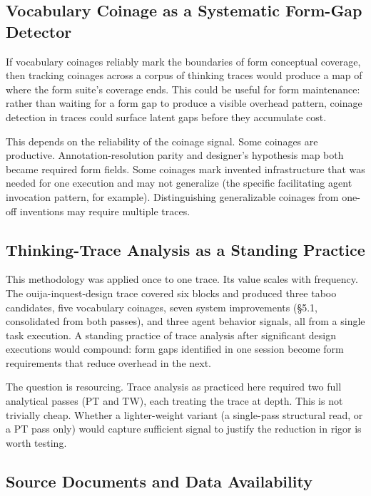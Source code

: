 \documentclass[11pt,a4paper]{article}
\begin{document}
\subsection{Vocabulary Coinage as a Systematic Form-Gap Detector}

If vocabulary coinages reliably mark the boundaries of form conceptual
coverage, then tracking coinages across a corpus of thinking traces would
produce a map of where the form suite's coverage ends. This could be useful
for form maintenance: rather than waiting for a form gap to produce a visible
overhead pattern, coinage detection in traces could surface latent gaps before
they accumulate cost.

This depends on the reliability of the coinage signal. Some coinages are
productive. Annotation-resolution parity and designer's hypothesis map both
became required form fields. Some coinages mark invented infrastructure that
was needed for one execution and may not generalize (the specific facilitating
agent invocation pattern, for example). Distinguishing generalizable coinages
from one-off inventions may require multiple traces.

\subsection{Thinking-Trace Analysis as a Standing Practice}

This methodology was applied once to one trace. Its value scales with
frequency. The ouija-inquest-design trace covered six blocks and produced three
taboo candidates, five vocabulary coinages, seven system improvements
(\S5.1, consolidated from both passes), and three agent behavior signals, all
from a single task execution. A standing practice of trace analysis after
significant design executions would compound: form gaps identified in one
session become form requirements that reduce overhead in the next.

The question is resourcing. Trace analysis as practiced here required two full
analytical passes (PT and TW), each treating the trace at depth. This is not
trivially cheap. Whether a lighter-weight variant (a single-pass structural
read, or a PT pass only) would capture sufficient signal to justify the
reduction in rigor is worth testing.

\subsection{Source Documents and Data Availability}
\label{sec:data}
\end{document}
